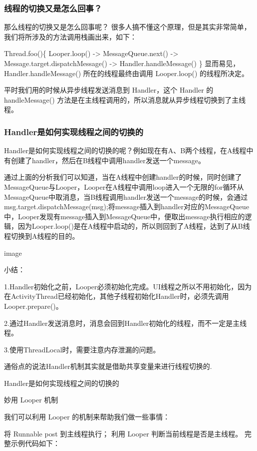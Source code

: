 \documentclass[9pt, b5paper]{article}
\begin{document}
\subsubsection{线程的切换又是怎么回事？}
\label{sec-2-3-3}
那么线程的切换又是怎么回事呢？
很多人搞不懂这个原理，但是其实非常简单，我们将所涉及的方法调用栈画出来，如下：

Thread.foo()\{
    Looper.loop()
     -> MessageQueue.next()
      -> Message.target.dispatchMessage()
       -> Handler.handleMessage()
\}
显而易见，Handler.handleMessage() 所在的线程最终由调用 Looper.loop() 的线程所决定。

平时我们用的时候从异步线程发送消息到 Handler，这个 Handler 的 handleMessage() 方法是在主线程调用的，所以消息就从异步线程切换到了主线程。
\subsubsection{Handler是如何实现线程之间的切换的}
\label{sec-2-3-4}
Handler是如何实现线程之间的切换的呢？例如现在有A、B两个线程，在A线程中有创建了handler，然后在B线程中调用handler发送一个message。

通过上面的分析我们可以知道，当在A线程中创建handler的时候，同时创建了MessageQueue与Looper，Looper在A线程中调用loop进入一个无限的for循环从MessageQueue中取消息，当B线程调用handler发送一个message的时候，会通过msg.target.dispatchMessage(msg);将message插入到handler对应的MessageQueue中，Looper发现有message插入到MessageQueue中，便取出message执行相应的逻辑，因为Looper.loop()是在A线程中启动的，所以则回到了A线程，达到了从B线程切换到A线程的目的。

image

小结：

1.Handler初始化之前，Looper必须初始化完成。UI线程之所以不用初始化，因为在ActivityThread已经初始化，其他子线程初始化Handler时，必须先调用Looper.prepare()。

2.通过Handler发送消息时，消息会回到Handler初始化的线程，而不一定是主线程。

3.使用ThreadLocal时，需要注意内存泄漏的问题。

通俗点的说法Handler机制其实就是借助共享变量来进行线程切换的.

Handler是如何实现线程之间的切换的

妙用 Looper 机制

我们可以利用 Looper 的机制来帮助我们做一些事情：

将 Runnable post 到主线程执行；
利用 Looper 判断当前线程是否是主线程。
完整示例代码如下：
\end{document}
